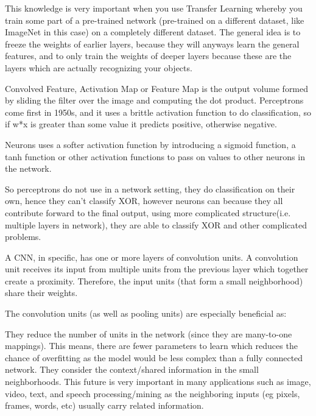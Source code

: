 \documentclass[a4paper]{article}
\begin{document}
This knowledge is very important when you use Transfer Learning whereby you train some part of a pre-trained network (pre-trained on a different dataset, like ImageNet in this case) on a completely different dataset. The general idea is to freeze the weights of earlier layers, because they will anyways learn the general features, and to only train the weights of deeper layers because these are the layers which are actually recognizing your objects.

Convolved Feature, Activation Map or Feature Map is the output volume formed by sliding the filter over the image and computing the dot product.
Perceptrons come first in 1950s, and it uses a brittle activation function to do classification, so if w*x is greater than some value it predicts positive, otherwise negative.

Neurons uses a softer activation function by introducing a sigmoid function, a tanh function or other activation functions to pass on values to other neurons in the network.

So perceptrons do not use in a network setting, they do classification on their own, hence they can’t classify XOR, however neurons can because they all contribute forward to the final output, using more complicated structure(i.e. multiple layers in network), they are able to classify XOR and other complicated problems.

A CNN, in specific, has one or more layers of convolution units. A convolution unit receives its input from multiple units from the previous layer which together create a proximity. Therefore, the input units (that form a small neighborhood) share their weights.

The convolution units (as well as pooling units) are especially beneficial as:

They reduce the number of units in the network (since they are many-to-one mappings). This means, there are fewer parameters to learn which reduces the chance of overfitting as the model would be less complex than a fully connected network.
They consider the context/shared information in the small neighborhoods. This future is very important in many applications such as image, video, text, and speech processing/mining as the neighboring inputs (eg pixels, frames, words, etc) usually carry related information.
\end{document}
